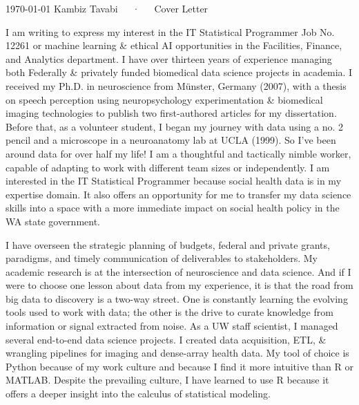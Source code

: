 \documentclass[13pt, letterpaper]{russell}
\begin{document}
\makecvheader[R]

\makecvfooter
{\today}
{Kambiz Tavabi~~~·~~~Cover Letter}
{\thepage}

\makelettertitle

\begin{cvletter}
  I am writing to express my interest in the IT Statistical Programmer Job No. 12261 or machine learning \& ethical AI opportunities in the Facilities, Finance, and Analytics department. I have over thirteen years of experience managing both Federally \& privately funded biomedical data science projects in academia. I received my Ph.D. in neuroscience from Münster, Germany (2007), with a thesis on speech perception using neuropsychology experimentation \& biomedical imaging technologies to publish two first-authored articles for my dissertation. Before that, as a volunteer student, I began my journey with data using a no. 2 pencil and a microscope in a neuroanatomy lab at UCLA (1999). So I've been around data for over half my life! I am a thoughtful and tactically nimble worker, capable of adapting to work with different team sizes or independently. I am interested in the IT Statistical Programmer because social health data is in my expertise domain. It also offers an opportunity for me to transfer my data science skills into a space with a more immediate impact on social health policy in the WA state government.

 I have overseen the strategic planning of budgets, federal and private grants, paradigms, and timely communication of deliverables to stakeholders. My academic research is at the intersection of neuroscience and data science. And if I were to choose one lesson about data from my experience, it is that the road from big data to discovery is a two-way street. One is constantly learning the evolving tools used to work with data; the other is the drive to curate knowledge from information or signal extracted from noise. As a UW staff scientist, I managed several end-to-end data science projects. I created data acquisition, ETL, \& wrangling pipelines for imaging and dense-array health data. My tool of choice is Python because of my work culture and because I find it more intuitive than R or MATLAB. Despite the prevailing culture, I have learned to use R because it offers a deeper insight into the calculus of statistical modeling.


\end{cvletter}
\end{document}
